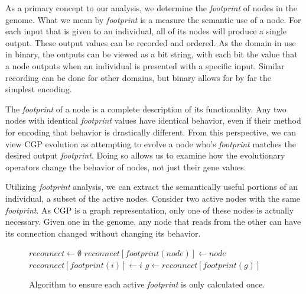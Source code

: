 \documentclass[journal]{IEEEtran}
\begin{document}
As a primary concept to our analysis, we determine the \emph{footprint} of nodes
in the genome.  What we mean by \emph{footprint} is a measure the semantic use
of a node.  For each input that is given to an individual, all of its nodes
will produce a single output.  These output values can be recorded and ordered.
As the domain in use in binary, the outputs can be viewed as a bit string, with
each bit the value that a node outputs when an individual is presented with a
specific input.  Similar recording can be done for other domains, but binary
allows for by far the simplest encoding.

The \emph{footprint} of a node is a complete description of its functionality.
Any two nodes with identical \emph{footprint} values have identical behavior,
even if their method for encoding that behavior is drastically different.  From
this perspective, we can view CGP evolution as attempting to evolve a node who's
\emph{footprint} matches the desired output \emph{footprint}.  Doing so allows
us to examine how the evolutionary operators change the behavior of nodes,
not just their gene values.

Utilizing \emph{footprint} analysis, we can extract the semantically useful
portions of an individual, a subset of the active nodes.  Consider two active
nodes with the same \emph{footprint}.  As CGP is a graph representation, only
one of these nodes is actually necessary.  Given one in the genome, any node that reads
from the other can have its connection changed without changing its behavior.

\begin{figure}
  \begin{algorithmic}
    \State $reconnect \leftarrow \emptyset$
      \State $reconnect[footprint(node)] \leftarrow node$
    \EndFor
      \State $reconnect[footprint(i)] \leftarrow i$
    \EndFor
          \State $g \leftarrow reconnect[footprint(g)]$
        \EndIf
      \EndIf
    \EndFor
  \EndProcedure
  \end{algorithmic}
  \caption{Algorithm to ensure each active \emph{footprint} is only
           calculated once.}
  \label{fig:simplify}
\end{figure}
\end{document}
